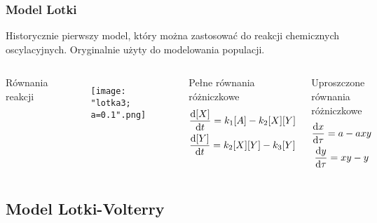 \documentclass{beamer}
\begin{document}
\begin{frame}
\frametitle{Model Lotki}
\small Historycznie pierwszy model, który można zastosować do reakcji chemicznych oscylacyjnych. Oryginalnie użyty do modelowania populacji. \normalsize
\begin{columns}
\begin{block}{Równania reakcji}
\begin{center}
	 \\
	 \\
\end{center}
\end{block}
\begin{figure}
\texttt{[image: "lotka3; a=0.1".png]}
\end{figure}
\begin{block}{Pełne równania różniczkowe}
\begin{gather*}
	\dv{[X]}{t}=k_{1}[A]-k_{2}[X][Y] \\
	\dv{[Y]}{t}=k_{2}[X][Y]-k_{3}[Y]
\end{gather*}
\end{block}
\begin{block}{Uproszczone równania różniczkowe}
\begin{gather*}
	\dv{x}{\tau} = a-axy \\
	\dv{y}{\tau} = xy-y
\end{gather*}
\end{block}
\end{columns}
\end{frame}

\subsection{Model Lotki-Volterry}
\end{document}
